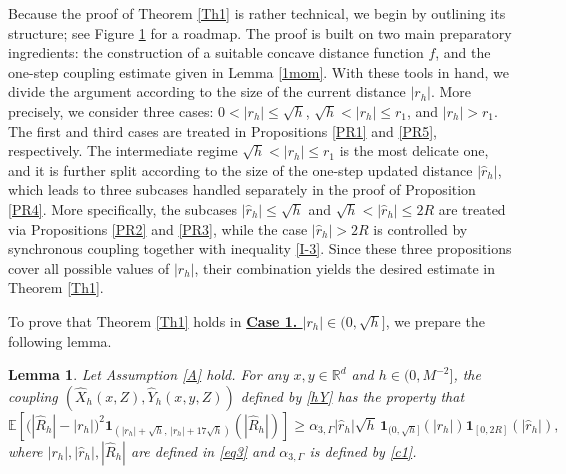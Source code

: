 \documentclass[aap]{imsart}
\theoremstyle{plain}
\newtheorem{lemma}[theorem]{Lemma}
\theoremstyle{definition}
\begin{document}
Because the proof of Theorem \ref{Th1} is rather technical, we begin by
outlining its structure; see Figure \ref{Figtu} for a roadmap. The proof is built on two
main preparatory ingredients: the construction of a suitable concave distance
function \(f\), and the one-step coupling estimate given in Lemma \ref{1mom}.
With these tools in hand, we divide the argument according to the size of the
current distance \(|r_h|\). More precisely, we consider three cases:
\(0<|r_h|\leqslant \sqrt h\), \(\sqrt h<|r_h|\leqslant r_1\), and
\(|r_h|>r_1\). The first and third cases are treated in
Propositions \ref{PR1} and \ref{PR5}, respectively. The intermediate regime
\(\sqrt h<|r_h|\leqslant r_1\) is the most delicate one, and it is further
split according to the size of the one-step updated distance
\(|\widehat r_h|\), which leads to three subcases handled separately in the
proof of Proposition \ref{PR4}. More specifically, the subcases
\(|\widehat r_h|\leqslant \sqrt h\) and
\(\sqrt h<|\widehat r_h|\leqslant 2R\) are treated via
Propositions \ref{PR2} and \ref{PR3}, while the case
\(|\widehat r_h|>2R\) is controlled by synchronous coupling together with
inequality \eqref{I-3}. Since these three propositions cover all possible
values of \(|r_h|\), their combination yields the desired estimate in Theorem
\ref{Th1}.
\begin{figure}[omitted: a diagram of this paper's results, not reproduced here]\label{Figtu}\end{figure}

		
To prove that Theorem \ref{Th1} holds in \underline{\bf{Case 1. \textit{ $|r_h|\in(0, \sqrt{h}]$}}}, we prepare the following lemma.

\begin{lemma}\label{Le9}
	Let Assumption \ref{A} hold. For any \(x,y\in\mathbb R^d\) and
	\(h\in(0,M^{-2}]\), the coupling \((\hat X_h(x,Z),\hat Y_h(x,y,Z))\) defined by \eqref{hY} has the property that 
	\[\mathbb E\left[
		\bigl(|\hat R_h|-|r_h|\bigr)^2
		\mathbf 1_{(|r_h|+\sqrt h,\,|r_h|+17\sqrt h)}
		(|\hat R_h|)
		\right]\geqslant
		\alpha_{3,\Gamma}
		|\hat r_h|\sqrt h\,
		\mathbf 1_{(0,\sqrt h]}(|r_h|)
		\mathbf 1_{[0,2R]}(|\hat r_h|),\]
		where $|r_h|, |\hat{r}_h|, |\hat{R}_h|$ are defined in \eqref{eq3} and $\alpha_{3, \Gamma}$ is defined by \eqref{c1}.
\end{lemma}
\end{document}
